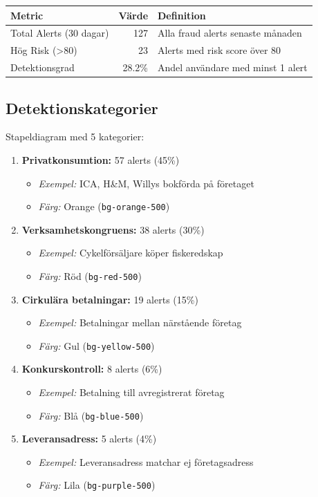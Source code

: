 \documentclass[12pt,a4paper]{article}
\begin{document}
\begin{table}[h]
\centering
\begin{tabular}{|l|r|p{6cm}|}
\hline
\textbf{Metric} & \textbf{Värde} & \textbf{Definition} \\
\hline
Total Alerts (30 dagar) & 127 & Alla fraud alerts senaste månaden \\
Hög Risk (>80) & 23 & Alerts med risk score över 80 \\
Detektionsgrad & 28.2\% & Andel användare med minst 1 alert \\
\hline
\end{tabular}
\end{table}

\subsection{Detektionskategorier}
Stapeldiagram med 5 kategorier:

\begin{enumerate}
  \item \textbf{Privatkonsumtion:} 57 alerts (45\%)
  \begin{itemize}
    \item \textit{Exempel:} ICA, H\&M, Willys bokförda på företaget
    \item \textit{Färg:} Orange (\texttt{bg-orange-500})
  \end{itemize}
  
  \item \textbf{Verksamhetskongruens:} 38 alerts (30\%)
  \begin{itemize}
    \item \textit{Exempel:} Cykelförsäljare köper fiskeredskap
    \item \textit{Färg:} Röd (\texttt{bg-red-500})
  \end{itemize}
  
  \item \textbf{Cirkulära betalningar:} 19 alerts (15\%)
  \begin{itemize}
    \item \textit{Exempel:} Betalningar mellan närstående företag
    \item \textit{Färg:} Gul (\texttt{bg-yellow-500})
  \end{itemize}
  
  \item \textbf{Konkurskontroll:} 8 alerts (6\%)
  \begin{itemize}
    \item \textit{Exempel:} Betalning till avregistrerat företag
    \item \textit{Färg:} Blå (\texttt{bg-blue-500})
  \end{itemize}
  
  \item \textbf{Leveransadress:} 5 alerts (4\%)
  \begin{itemize}
    \item \textit{Exempel:} Leveransadress matchar ej företagsadress
    \item \textit{Färg:} Lila (\texttt{bg-purple-500})
  \end{itemize}
\end{enumerate}
\end{document}
